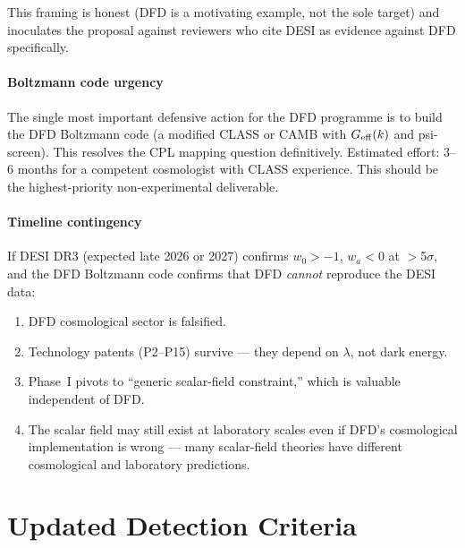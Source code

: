 \documentclass[11pt]{article}
\theoremstyle{definition}
\theoremstyle{remark}
\begin{document}
This framing is honest (DFD is a motivating example, not the sole
target) and inoculates the proposal against reviewers who cite DESI
as evidence against DFD specifically.

\subsection{Boltzmann code urgency}

The single most important defensive action for the DFD programme is
to build the DFD Boltzmann code (a modified CLASS or CAMB with
$G_{\rm eff}(k)$ and psi-screen). This resolves the CPL mapping
question definitively. Estimated effort: 3--6 months for a competent
cosmologist with CLASS experience. This should be the highest-priority
non-experimental deliverable.

\subsection{Timeline contingency}

If DESI DR3 (expected late 2026 or 2027) confirms $w_0 > -1$,
$w_a < 0$ at $>$5$\sigma$, and the DFD Boltzmann code confirms
that DFD \emph{cannot} reproduce the DESI data:

\begin{enumerate}[nosep]
\item DFD cosmological sector is falsified.
\item Technology patents (P2--P15) survive --- they depend on $\lambda$,
  not dark energy.
\item Phase~I pivots to ``generic scalar-field constraint,'' which
  is valuable independent of DFD.
\item The scalar field may still exist at laboratory scales even if
  DFD's cosmological implementation is wrong --- many scalar-field
  theories have different cosmological and laboratory predictions.
\end{enumerate}


\part{Updated Detection Criteria}
\label{part:detection}
\end{document}
